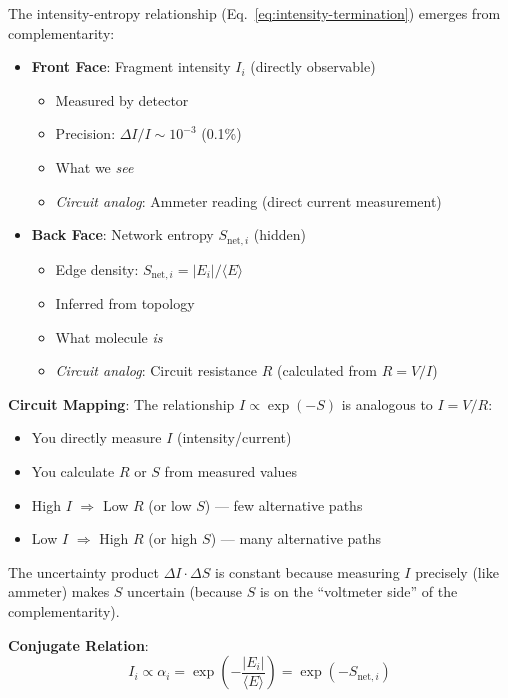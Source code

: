 \documentclass[twocolumn,10pt,a4paper]{article}
\theoremstyle{definition}
\theoremstyle{remark}
\begin{document}
The intensity-entropy relationship (Eq.~\ref{eq:intensity-termination}) emerges from complementarity:

\begin{itemize}
\item \textbf{Front Face}: Fragment intensity $I_i$ (directly observable)
  \begin{itemize}
  \item Measured by detector
  \item Precision: $\Delta I / I \sim 10^{-3}$ (0.1\%)
  \item What we \emph{see}
  \item \emph{Circuit analog}: Ammeter reading (direct current measurement)
  \end{itemize}

\item \textbf{Back Face}: Network entropy $S_{\text{net},i}$ (hidden)
  \begin{itemize}
  \item Edge density: $S_{\text{net},i} = |E_i| / \langle E \rangle$
  \item Inferred from topology
  \item What molecule \emph{is}
  \item \emph{Circuit analog}: Circuit resistance $R$ (calculated from $R = V/I$)
  \end{itemize}
\end{itemize}

\textbf{Circuit Mapping}: The relationship $I \propto \exp(-S)$ is analogous to $I = V/R$:
\begin{itemize}
\item You directly measure $I$ (intensity/current)
\item You calculate $R$ or $S$ from measured values
\item High $I$ $\Rightarrow$ Low $R$ (or low $S$) --- few alternative paths
\item Low $I$ $\Rightarrow$ High $R$ (or high $S$) --- many alternative paths
\end{itemize}

The uncertainty product $\Delta I \cdot \Delta S$ is constant because measuring $I$ precisely (like ammeter) makes $S$ uncertain (because $S$ is on the ``voltmeter side'' of the complementarity).

\textbf{Conjugate Relation}:
\begin{equation}
I_i \propto \alpha_i = \exp\left(-\frac{|E_i|}{\langle E \rangle}\right) = \exp(-S_{\text{net},i})
\end{equation}
\end{document}
